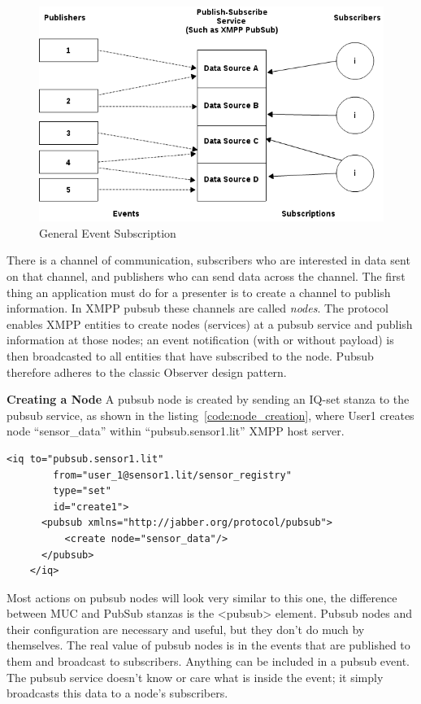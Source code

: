 \begin{figure}[!ht]
    \centering
    \includegraphics[scale=0.5]{images/XEP0060.png}   
    \caption[General Event Subscription]{General Event Subscription}  
    \label{img:basic-pubsub}                    
\end{figure}

There is a channel of communication, subscribers who are interested in data sent on that channel, and publishers who can send data across the channel. The first thing an application must do for a presenter is to create a channel to publish information. In XMPP pubsub these channels are called \emph{nodes}. The protocol enables XMPP entities to create nodes (services) at a pubsub service and publish information at those nodes; an event notification (with or without payload) is then broadcasted to all entities that have subscribed to the node. Pubsub therefore adheres to the classic Observer design pattern.

	\textbf{Creating a Node}
	\newline
	A pubsub node is created by sending an IQ-set stanza to the pubsub service, as shown in the listing~\ref{code:node_creation}, where User1 creates node ``sensor\_data'' within ``pubsub.sensor1.lit'' XMPP host server.
		\begin{lstlisting}[label=code:node_creation,caption=PubSub Node Creation]
	<iq to="pubsub.sensor1.lit"
	    from="user_1@sensor1.lit/sensor_registry"
	    type="set"
	    id="create1">
	  <pubsub xmlns="http://jabber.org/protocol/pubsub">
	      <create node="sensor_data"/>
	  </pubsub>
	</iq>
		\end{lstlisting}
	Most actions on pubsub nodes will look very similar to this one, the difference between MUC and PubSub stanzas is the <pubsub> element. Pubsub nodes and their configuration are necessary and useful, but they don't do much by themselves. The real value of pubsub nodes is in the events that are published to them and broadcast to subscribers. Anything can be included in a pubsub event. The pubsub service doesn’t know or care what is inside the event; it simply broadcasts this data to a node’s subscribers.

